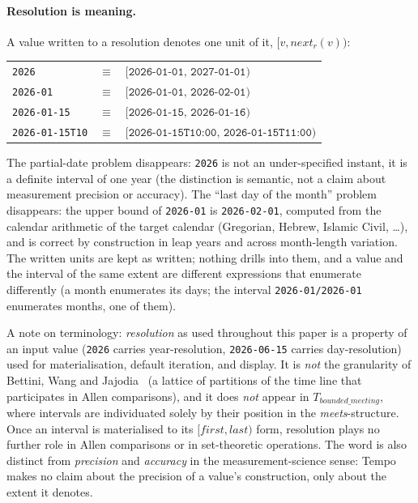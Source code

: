 \paragraph*{Resolution is meaning.} A value written to a resolution
denotes one unit of it, $[v, \mathit{next}_r(v))$:
\begin{center}
\begin{tabular}{lcl}
  \texttt{2026}              &$\equiv$& $[\texttt{2026-01-01},\, \texttt{2027-01-01})$ \\
  \texttt{2026-01}           &$\equiv$& $[\texttt{2026-01-01},\, \texttt{2026-02-01})$ \\
  \texttt{2026-01-15}        &$\equiv$& $[\texttt{2026-01-15},\, \texttt{2026-01-16})$ \\
  \texttt{2026-01-15T10}     &$\equiv$& $[\texttt{2026-01-15T10:00},\, \texttt{2026-01-15T11:00})$ \\
\end{tabular}
\end{center}
The partial-date problem disappears: \texttt{2026} is not an
under-specified instant, it is a definite interval of one year (the
distinction is semantic, not a claim about measurement precision or
accuracy). The ``last day of the month'' problem disappears: the
upper bound of \texttt{2026-01} is
\texttt{2026-02-01}, computed from the calendar arithmetic of the
target calendar (Gregorian, Hebrew, Islamic Civil, \dots), and is
correct by construction in leap years and across month-length
variation. The written units are kept as written; nothing drills into
them, and a value and the interval of the same extent are different
expressions that enumerate differently (a month enumerates its days;
the interval \texttt{2026-01/2026-01} enumerates months, one of
them).

A note on terminology: \emph{resolution} as used
throughout this paper is a property of an input value
(\texttt{2026} carries year-resolution, \texttt{2026-06-15} carries
day-resolution) used for materialisation, default
iteration, and display. It is \emph{not} the granularity of
Bettini, Wang and Jajodia~\cite{bettini-granularities} (a lattice
of partitions of the time line that participates in Allen
comparisons), and it does \emph{not} appear in
$T_{bounded\_meeting}$, where intervals are individuated solely by
their position in the \textit{meets}-structure. Once an interval is
materialised to its $[\mathit{first}, \mathit{last})$ form,
resolution plays no further role in Allen comparisons or in
set-theoretic operations. The word is also distinct from
\emph{precision} and \emph{accuracy} in the measurement-science
sense: Tempo makes no claim about the precision of a value's
construction, only about the extent it denotes.

